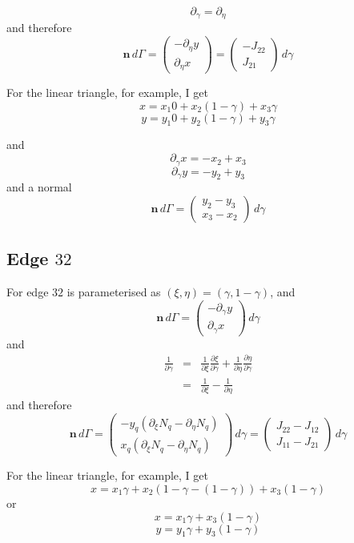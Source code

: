 \documentclass[10pt,a4paper]{book}
\newcommand{\p}{\partial}
\begin{document}
\[
\p_{\gamma}=\p_{\eta}
\]
and therefore
\[
\bm{n}\, d \Gamma=
\begin{pmatrix}
-\p_{\eta} y \\
\p_{\eta} x 
\end{pmatrix}
=
\begin{pmatrix}
-J_{22} \\
J_{21}
\end{pmatrix}
\, d \gamma
\]

For the linear triangle, for example, I get
\[ x=x_1 0 + x_2 (1-\gamma) + x_3 \gamma  \]
\[ y=y_1 0 + y_2 (1-\gamma) + y_3 \gamma  \]

and 
\[\p_{\gamma} x= -x_2+x_3 \]
\[\p_{\gamma} y= -y_2+y_3 \]
and a normal
\[
\bm{n} \, d \Gamma
= \left ( \begin{array}{c} y_2 -y_3 \\ x_3 - x_2 \end{array} \right ) \, d \gamma
\]



\subsection{Edge $32$}

For edge $32$ is parameterised as $(\xi,\eta)=(\gamma, 1-\gamma)$, and 
\[
\bm{n} \, d \Gamma= \left ( \begin{array}{c} -\p_{\gamma} y \\ \p_{\gamma} x \end{array} \right ) \,
d \gamma
\]
and
\begin{eqnarray*}
\frac{1}{\p \gamma}&=&\frac{1}{\p \xi} \frac{\p \xi}{\p \gamma} +\frac{1}{\p \eta} \frac{\p \eta}{\p \gamma}\\
&=&\frac{1}{\p \xi}  - \frac{1}{\p \eta} 
\end{eqnarray*}
and therefore
\[
\bm{n} \, d \Gamma= \left ( \begin{array}{c} -y_q (\p_{\xi} N_q -\p_{\eta} N_q) \\ 
x_q (\p_{\xi} N_q - \p_{\eta} N_q) \end{array} \right ) \,
d \gamma
=
\begin{pmatrix}
J_{22}-J_{12} \\
J_{11}-J_{21}
\end{pmatrix}
\, d \gamma
\]

For the linear triangle, for example, I get
\[ x=x_1 \gamma + x_2 (1-\gamma-(1-\gamma)) + x_3 (1-\gamma)  \]
or
\[ x=x_1 \gamma + x_3 (1-\gamma)  \]
\[ y=y_1 \gamma + y_3 (1-\gamma)  \]
\end{document}
